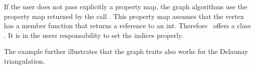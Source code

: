 If the user does not pass explicitly a property map, the graph algorithms
use the property map returned by the call .
This property map assumes that the vertex has a 
member function  that returns a reference to an int.
Therefore \cgal\ offers a class .
It is in the users responsability to set the indices properly.

The example further illustrates that the graph traits also works
for the Delaunay triangulation.












